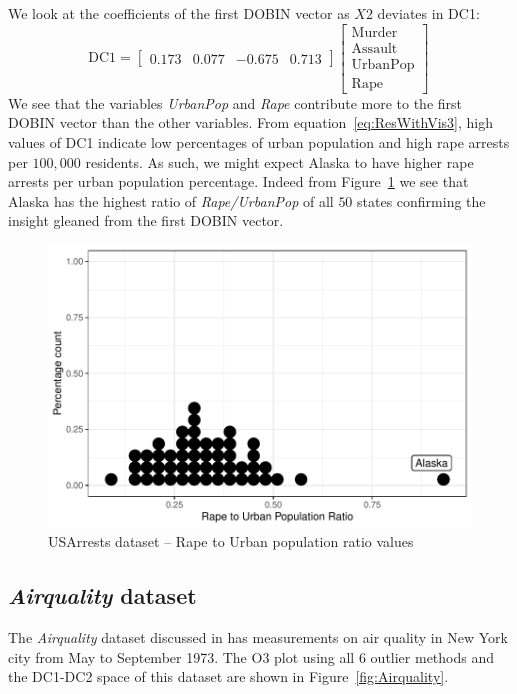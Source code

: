 \documentclass[11pt]{article}
\begin{document}
\noindent
We look at the coefficients of the first DOBIN vector as  $X2$ deviates in DC1:
\begin{equation}\label{eq:ResWithVis3}
    \text{DC1} = \begin{bmatrix}
    0.173 & 0.077 &  -0.675 & 0.713   
    \end{bmatrix}
    \begin{bmatrix}
    \text{Murder} \\
    \text{Assault} \\
    \text{UrbanPop} \\
    \text{Rape} 
    \end{bmatrix} \, 
\end{equation}
We see that the variables \textit{UrbanPop} and \textit{Rape} contribute more to the first DOBIN vector than the other variables. From equation~\eqref{eq:ResWithVis3},  high values of DC1 indicate  low percentages of urban population and high rape arrests per $100,000$ residents. As such, we might expect Alaska to have higher rape arrests per urban population percentage. Indeed from Figure~\ref{fig:USArrests3} we see that Alaska has the highest ratio of  \textit{Rape/UrbanPop} of all $50$ states confirming the insight gleaned from the first DOBIN vector. 

\begin{figure}[!ht]
	\centering
	\includegraphics[scale=0.48]{Ex3_3.pdf}
	\caption{USArrests dataset -- Rape to Urban population ratio values}
	\label{fig:USArrests3}
\end{figure}


\subsection{\textit{Airquality} dataset}\label{sec:ResWithVis4}
The \textit{Airquality} dataset discussed in \cite{john1983graphical} has measurements on air quality in New York city from May to September 1973.  The O3 plot using all $6$ outlier methods and the DC1-DC2 space of this dataset are shown in Figure~\ref{fig:Airquality}.
\end{document}
